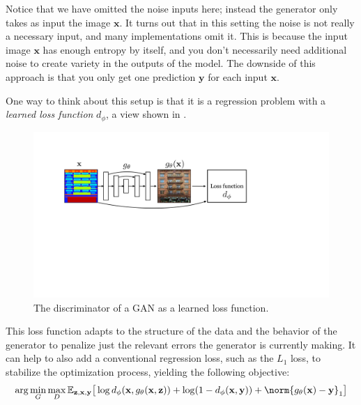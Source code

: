 Notice that we have omitted the noise inputs here; instead the generator only takes as input the image $\mathbf{x}$. It turns out that in this setting the noise is not really a necessary input, and many implementations omit it. This is because the input image $\mathbf{x}$ has enough entropy by itself, and you don't necessarily need additional noise to create variety in the outputs of the model. The downside of this approach is that you only get one prediction $\mathbf{y}$ for each input $\mathbf{x}$.

One way to think about this setup is that it is a regression problem with a \textit{learned loss function} $d_{
            \phi}$, a view shown in \fig{\ref{fig:conditional_generative_models:cGAN_as_learned_loss}}.
\begin{figure}[h!]
    \centerline{
        \includegraphics[width=0.9\linewidth]{./figures/conditional_generative_models/cGAN_as_learned_loss.pdf}
    }
    \caption{The discriminator of a GAN as a learned loss function.}
    \label{fig:conditional_generative_models:cGAN_as_learned_loss}
\end{figure}

This loss function adapts to the structure of the data and the behavior of the generator to penalize just the relevant errors the generator is currently making. It can help to also add a conventional regression loss, such as the $L_1$ loss, to stabilize the optimization process, yielding the following objective:
\begin{align}
    \arg\min_G\max_D \mathbb{E}_{\mathbf{z},\mathbf{x},\mathbf{y}} \big[ \log d_{\phi}(\mathbf{x}, g_{\theta}(\mathbf{x},\mathbf{z})) + \log (1 - d_{\phi}(\mathbf{x}, \mathbf{y})) + \norm{g_{\theta}(\mathbf{x}) - \mathbf{y}}_1 \big]\label{eqn:conditional_generative_models:cGAN_objective_plus_L}
\end{align}

